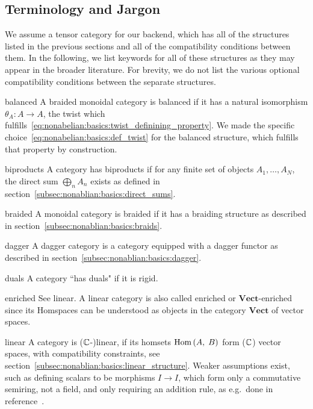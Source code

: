 \subsection{Terminology and Jargon}
\label{subsec:nonablian:basics:jargon}

We assume a tensor category for our backend, which has all of the structures listed in the previous sections and all of the compatibility conditions between them.
%
In the following, we list keywords for all of these structures as they may appear in the broader literature.
%
For brevity, we do not list the various optional compatibility conditions between the separate structures.

\begin{jargon} %
    \item[balanced]
    A braided monoidal category is balanced if it has a natural isomorphism $\theta_A: A \to A$, the twist which fulfills~\eqref{eq:nonabelian:basics:twist_definining_property}. We made the specific choice~\eqref{eq:nonabelian:basics:def_twist} for the balanced structure, which fulfills that property by construction.
    
    \item[biproducts]
    A category has biproducts if for any finite set of objects $A_1,\dots,A_N$, the direct sum $\bigoplus_n A_n$ exists as defined in section~\ref{subsec:nonablian:basics:direct_sums}.
    
    \item[braided]
    A monoidal category is braided if it has a braiding structure as described in section~\ref{subsec:nonablian:basics:braids}.
    
    \item[dagger]
    A dagger category is a category equipped with a dagger functor as described in section~\ref{subsec:nonablian:basics:dagger}.
    
    \item[duals]
    A category ``has duals" if it is rigid.
    
    \item[enriched]
    See linear. A linear category is also called enriched or $\mathbf{Vect}$-enriched since its Homspaces can be understood as objects in the category $\mathbf{Vect}$ of vector spaces.
    
    \item[linear]
    A category is ($\mathbb{C}$-)linear, if its homsets $\mathrm{Hom}\left(A,\; B\right)$ form ($\mathbb{C}$) vector spaces, with compatibility constraints, see section~\ref{subsec:nonablian:basics:linear_structure}. Weaker assumptions exist, such as defining scalars to be morphisms $I \to I$, which form only a commutative semiring, not a field, and only requiring an addition rule, as e.g.~done in reference~\cite[chpt. 2]{heunen2019}.
    

\end{jargon}
